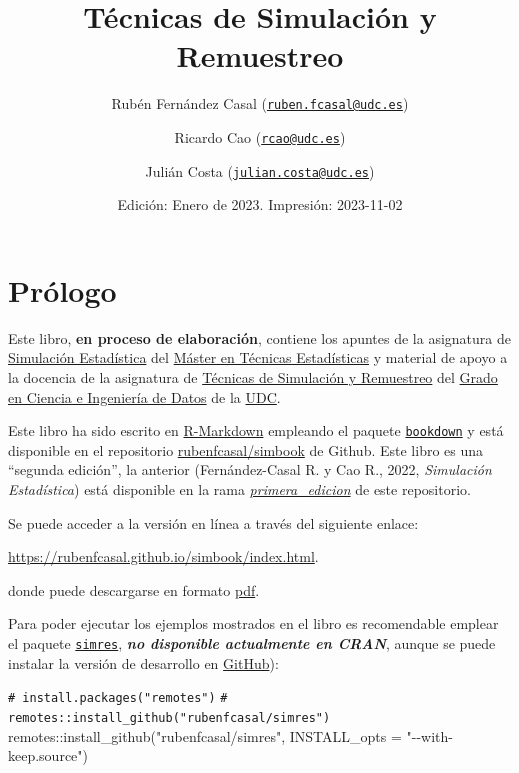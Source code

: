 \documentclass[
]{book}
\title{Técnicas de Simulación y Remuestreo}
\author{Rubén Fernández Casal (\href{mailto:ruben.fcasal@udc.es}{\nolinkurl{ruben.fcasal@udc.es}}) \and Ricardo Cao (\href{mailto:rcao@udc.es}{\nolinkurl{rcao@udc.es}}) \and Julián Costa (\href{mailto:julian.costa@udc.es}{\nolinkurl{julian.costa@udc.es}})}
\date{Edición: Enero de 2023. Impresión: 2023-11-02}
\newenvironment{Shaded}{\begin{snugshade}}{\end{snugshade}}
\newcommand{\AttributeTok}[1]{\textcolor[rgb]{0.77,0.63,0.00}{#1}}
\newcommand{\CommentTok}[1]{\textcolor[rgb]{0.56,0.35,0.01}{\textit{#1}}}
\newcommand{\FunctionTok}[1]{\textcolor[rgb]{0.00,0.00,0.00}{#1}}
\newcommand{\NormalTok}[1]{#1}
\newcommand{\SpecialCharTok}[1]{\textcolor[rgb]{0.00,0.00,0.00}{#1}}
\newcommand{\StringTok}[1]{\textcolor[rgb]{0.31,0.60,0.02}{#1}}
\theoremstyle{break}
\theoremstyle{nonumberplain}
\renewcommand{\CommentTok}[1]{\textcolor[rgb]{0.41,0.41,0.41}{\texttt{#1}}}
\begin{document}
\maketitle

{
\setcounter{tocdepth}{1}
\tableofcontents
}
\hypertarget{pruxf3logo}{%
\chapter*{Prólogo}\label{pruxf3logo}}

Este libro, \textbf{en proceso de elaboración}, contiene los apuntes de la asignatura de \href{http://eamo.usc.es/pub/mte/index.php/es/?option=com_content\&view=article\&id=2201\&idm=13\&a\%C3\%B1o=2019}{Simulación Estadística} del \href{http://eio.usc.es/pub/mte}{Máster en Técnicas Estadísticas} y material de apoyo a la docencia de la asignatura de \href{https://guiadocente.udc.es/guia_docent/index.php?centre=614\&ensenyament=614G02\&assignatura=614G02036\&idioma=cast}{Técnicas de Simulación y Remuestreo} del \href{https://estudos.udc.es/es/study/start/614G02V01}{Grado en Ciencia e Ingeniería de Datos} de la \href{https://www.udc.es}{UDC}.

Este libro ha sido escrito en \href{http://rmarkdown.rstudio.com}{R-Markdown} empleando el paquete \href{https://bookdown.org/yihui/bookdown/}{\texttt{bookdown}} y está disponible en el repositorio \href{https://github.com/rubenfcasal/simbook}{rubenfcasal/simbook} de Github.
Este libro es una ``segunda edición'', la anterior (Fernández-Casal R. y Cao R., 2022, \emph{Simulación Estadística}) está disponible en la rama \emph{\href{https://github.com/rubenfcasal/simbook/tree/primera_edicion}{primera\_edicion}} de este repositorio.

Se puede acceder a la versión en línea a través del siguiente enlace:

\url{https://rubenfcasal.github.io/simbook/index.html}.

donde puede descargarse en formato \href{https://rubenfcasal.github.io/simbook/Simulacion.pdf}{pdf}.

Para poder ejecutar los ejemplos mostrados en el libro es recomendable emplear el paquete \href{https://rubenfcasal.github.io/simres}{\texttt{simres}}, \textbf{\emph{no disponible actualmente en CRAN}}, aunque se puede instalar la versión de desarrollo en \href{https://github.com/rubenfcasal/simres}{GitHub}):

\begin{Shaded}
\begin{Highlighting}[]
\CommentTok{\# install.packages("remotes")}
\CommentTok{\# remotes::install\_github("rubenfcasal/simres")}
\NormalTok{remotes}\SpecialCharTok{::}\FunctionTok{install\_github}\NormalTok{(}\StringTok{"rubenfcasal/simres"}\NormalTok{, }\AttributeTok{INSTALL\_opts =} \StringTok{"{-}{-}with{-}keep.source"}\NormalTok{)}
\end{Highlighting}
\end{Shaded}
\end{document}
